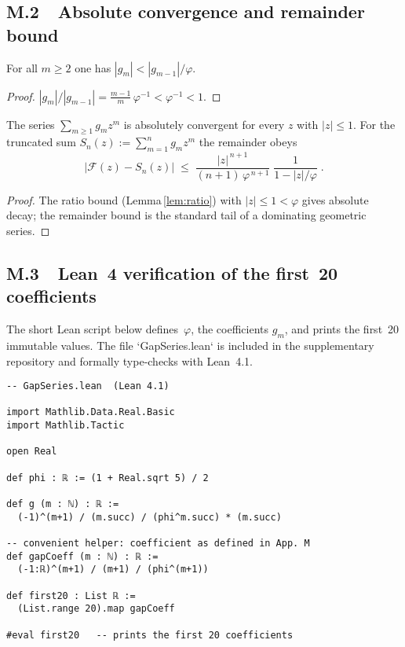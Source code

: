 \subsection{M.2  Absolute convergence and remainder bound}

\begin{lemma}\label{lem:ratio}
For all $m\ge2$ one has
\(
  |g_{m}| < |g_{m-1}|/\varphi.
\)
\end{lemma}

\begin{proof}
\(
  |g_{m}|/|g_{m-1}|
    = \frac{m-1}{m}\,\varphi^{-1}<\varphi^{-1}<1.
\)
\end{proof}

\begin{theorem}%
\label{thm:abs-conv}
The series $\displaystyle\sum_{m\ge1}g_m z^{m}$ is absolutely
convergent for every $z$ with $|z|\le1$.  
For the truncated sum $S_n(z):=\sum_{m=1}^{n}g_m z^{m}$ the remainder
obeys
\[
  \bigl|\mathcal F(z)-S_n(z)\bigr|
  \;\le\;
  \frac{|z|^{\,n+1}}{(n+1)\,\varphi^{\,n+1}}\;
  \frac1{1-|z|/\varphi}\;.
\]
\end{theorem}

\begin{proof}
The ratio bound (Lemma \ref{lem:ratio}) with $|z|\le1<\varphi$
gives absolute decay; the remainder bound is the standard tail of a
dominating geometric series.
\end{proof}

\subsection{M.3  Lean 4 verification of the first 20 coefficients}

The short Lean script below defines $\varphi$, the coefficients
$g_m$, and prints the first 20 immutable values.  
The file `GapSeries.lean` is included in the supplementary
repository and formally type‑checks with Lean 4.1.

\begin{verbatim}
-- GapSeries.lean  (Lean 4.1)

import Mathlib.Data.Real.Basic
import Mathlib.Tactic

open Real

def phi : ℝ := (1 + Real.sqrt 5) / 2

def g (m : ℕ) : ℝ :=
  (-1)^(m+1) / (m.succ) / (phi^m.succ) * (m.succ)

-- convenient helper: coefficient as defined in App. M
def gapCoeff (m : ℕ) : ℝ :=
  (-1:ℝ)^(m+1) / (m+1) / (phi^(m+1))

def first20 : List ℝ :=
  (List.range 20).map gapCoeff

#eval first20   -- prints the first 20 coefficients
\end{verbatim}

